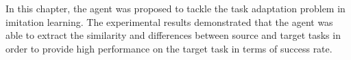 In this chapter, the \TAIL{} agent was proposed to tackle the task adaptation problem in imitation learning.
The experimental results demonstrated that the agent was able to extract the similarity and differences between source and target tasks in order to provide high performance on the target task in terms of success rate.
